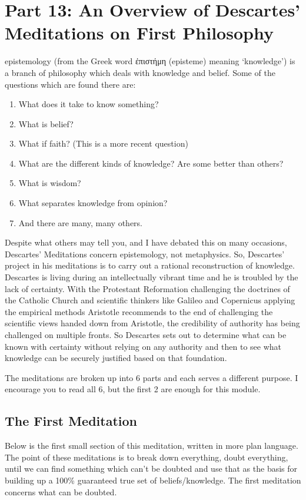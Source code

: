 \chapter{Part 13: An Overview of Descartes' Meditations on First Philosophy}

\Gls{epistemology} (from the Greek word ἐπιστήμη 
(epist\-em\-e) meaning ‘knowledge’) is a branch of philosophy which deals with knowledge and belief. Some of the questions which are found there are:
\begin{enumerate}
    \item What does it take to know something?
    \item What is belief?
    \item What if faith? (This is a more recent question)
    \item What are the different kinds of knowledge? Are some better than others?
    \item What is wisdom?
    \item What separates knowledge from opinion?
    \item And there are many, many others.
\end{enumerate}
Despite what others may tell you, and I have debated this on many occasions, Descartes' Meditations concern epistemology, not metaphysics. So, Descartes' project in his meditations is to carry out a rational reconstruction of knowledge. Descartes is living during an intellectually vibrant time and he is troubled by the lack of certainty. With the Protestant Reformation challenging the doctrines of the Catholic Church and scientific thinkers like Galileo and Copernicus applying the empirical methods Aristotle recommends to the end of challenging the scientific views handed down from Aristotle, the credibility of authority has being challenged on multiple fronts. So Descartes sets out to determine what can be known with certainty without relying on any authority and then to see what knowledge can be securely justified based on that foundation.

The meditations are broken up into 6 parts and each serves a different purpose. I encourage you to read all 6, but the first 2 are enough for this module.
\section{The First Meditation}
Below is the first small section of this meditation, written in more plan language. The point of these meditations is to break down everything, doubt everything, until we can find something which can’t be doubted and use that as the basis for building up a 100\% guaranteed true set of beliefs/knowledge. The first meditation concerns what can be doubted.

